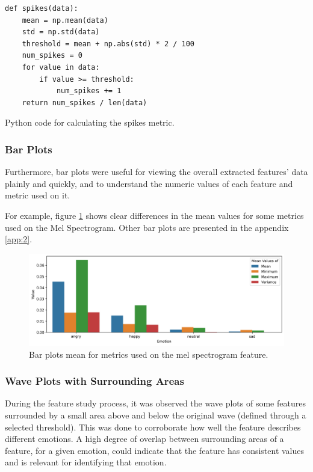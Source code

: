 \begin{listing}[H]
	\begin{verbatim}
def spikes(data):
	mean = np.mean(data)
	std = np.std(data)
	threshold = mean + np.abs(std) * 2 / 100
	num_spikes = 0
	for value in data:
		if value >= threshold:
			num_spikes += 1
	return num_spikes / len(data)
	\end{verbatim}
	\caption{Python code for calculating the spikes metric.}
	\label{spikes:code}
\end{listing}



\subsubsection{Bar Plots}

Furthermore, bar plots were useful for viewing the overall extracted features' data plainly and quickly, and to understand the numeric values of each feature and metric used on it.

For example, figure \ref{fig:melBarPlot} shows clear differences in the mean values for some metrics used on the Mel Spectrogram. Other bar plots are presented in the appendix \ref{app:2}.

\begin{figure}[H]
	\centering
	\includegraphics[width=\textwidth]{figs/4_1_traditional/meanFeatBarPlot.png}
	\caption{Bar plots mean for metrics used on the mel spectrogram feature.}
	\label{fig:melBarPlot}
\end{figure}


\subsubsection{Wave Plots with Surrounding Areas}

During the feature study process, it was observed the wave plots of some features surrounded by a small area above and below the original wave (defined through a selected threshold). This was done to corroborate how well the feature describes different emotions. A high degree of overlap between surrounding areas of a feature, for a given emotion, could indicate that the feature  has consistent values and is relevant for identifying that emotion.


